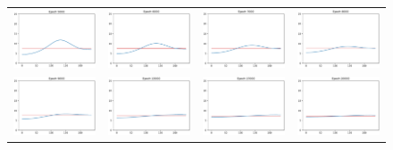 \documentclass{aleph-revista}
\begin{document}
\begin{figure}[!ht]
\begin{tabular}{cccc}
    \includegraphics[width=0.22\linewidth]{res_5000}  &
    \includegraphics[width=0.22\linewidth]{res_6000}  &
    \includegraphics[width=0.22\linewidth]{res_7000}  &
    \includegraphics[width=0.22\linewidth]{res_8000}    \\

    \includegraphics[width=0.22\linewidth]{res_9000}  &
    \includegraphics[width=0.22\linewidth]{res_13000} &
    \includegraphics[width=0.22\linewidth]{res_17000} &
    \includegraphics[width=0.22\linewidth]{res_20000}   \\


\end{tabular}
\end{figure}
\end{document}
